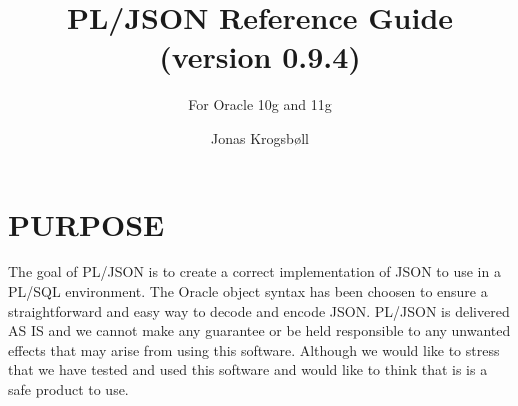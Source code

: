 \documentclass[11pt,a4paper]{article}
\title{PL/JSON Reference Guide (version 0.9.4)}
\subtitle{For Oracle 10g and 11g}
\author{Jonas Krogsbøll}
\date{}
\begin{document}
\maketitle
\vspace{2in}
\tableofcontents
\newpage

\section{PURPOSE}
The goal of PL/JSON is to create a correct implementation of JSON to use in a PL/SQL environment. The Oracle object syntax has been choosen to ensure a straightforward and easy way to decode and encode JSON. PL/JSON is delivered AS IS and we cannot make any guarantee or be held responsible to any unwanted effects that may arise from using this software. Although we would like to stress that we have tested and used this software and would like to think that is is a safe product to use.
\end{document}

